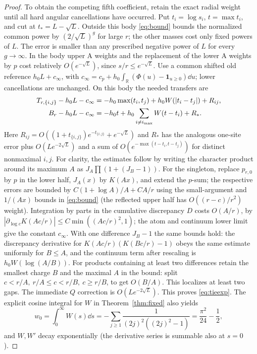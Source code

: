 \begin{proof}
To obtain the competing fifth coefficient, retain the exact radial weight until all hard angular cancellations have occurred. Put \(t_i=\log s_i\), \(t=\max t_i\), and cut at \(t_*=L-\sqrt L\). Outside this body \eqref{eq:bound} bounds the normalized common power by \((2/\sqrt L)^g\) for large \(r\); the other masses cost only fixed powers of \(L\). The error is smaller than any prescribed negative power of \(L\) for every \(g\to\infty\). In the body upper A weights and the replacement of the lower A weights by \(p\) cost relatively \(O(e^{-\sqrt L})\), since \(s/r\le e^{-\sqrt L}\). Use a common shifted old reference \(h_0L+c_\infty\), with \(c_\infty=c_p+h_0\int_{\mathbb R}(\Phi(u)-\mathbf1_{u\ge0})\dd u\); lower cancellations are unchanged. On this body the needed transfers are
\begin{align}
 T_{r,\{i,j\}}-h_0 L-c_\infty&=-h_0\max(t_i,t_j)+h_0W(|t_i-t_j|)+R_{ij},\notag\\
 B_r-h_0 L-c_\infty&=-h_0t+h_0\sum_{i\ne i_{\max}}W(t-t_i)+R_* .\label{eq:tieexp}
\end{align}
Here \(R_{ij}=O((1+t_{\{i,j\}})e^{-t_{\{i,j\}}}+e^{-\sqrt L})\) and \(R_*\) has the analogous one-site error plus \(O(Le^{-2\sqrt L})\) and a sum of \(O(e^{-\max(t-t_i,t-t_j)})\) for distinct nonmaximal \(i,j\).
For clarity, the estimates follow by writing the character product around its maximum \(A\) as \(J_A\prod(1+(J_B-1))\). For the singleton, replace \(p_{r,0}\) by \(p\) in the lower half, \(J_A(x)\) by \(K(Ax)\), and extend the \(p\)-sum; the respective errors are bounded by \(C(1+\log A)/A+C A/r\) using the small-argument and \(1/(Ax)\) bounds in \eqref{eq:bound} (the reflected upper half has \(O((r-c)/r^2)\) weight). Integration by parts in the cumulative discrepancy \(D\) costs \(O(A/r)\), by
\(\left|\partial_{\log c}K(Ac/r)\right|\le C\min((Ac/r)^2,1)\);
the atom and continuum lower limit give the constant \(c_\infty\). With one difference \(J_B-1\) the same bounds hold: the discrepancy derivative for \(K(Ac/r)(K(Bc/r)-1)\) obeys the same estimate uniformly for \(B\le A\), and the continuum term after rescaling is \(h_0W(\log(A/B))\). For products containing at least two differences retain the smallest charge \(B\) and the maximal \(A\) in the bound: split \(c<r/A,\ r/A\le c<r/B,\ c\ge r/B\), to get \(O(B/A)\). This localizes at least two gaps. The immediate \(Q\) correction is \(O(Le^{-2\sqrt L})\). This proves \eqref{eq:tieexp}. The explicit cosine integral for \(W\) in Theorem~\ref{thm:fixed} also yields
\[
 w_0=\int_0^\infty W(s)\dd s
   =-\sum_{j\ge1}\frac1{(2j)^2((2j)^2-1)}=\frac{\pi^2}{24}-\frac12 ,
\]
and \(W,W'\) decay exponentially (the derivative series is summable also at \(s=0\)).


\end{proof}
